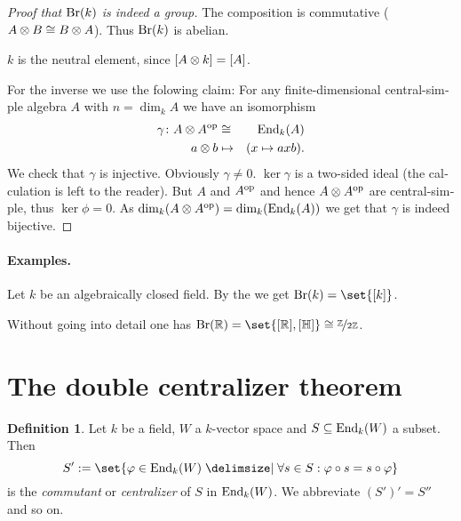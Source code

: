 \documentclass[12pt,a4paper]{scrartcl}
\theoremstyle{cplain}
\theoremstyle{cplain}
\theoremstyle{cplain}
\theoremstyle{definition}
\newtheorem*{deff}{Definition}
\begin{document}
\begin{otherlanguage}{english}
\begin{proof}[Proof that $\operatorname{Br}(k)$ is indeed a group]
  The composition is commutative ($A \otimes B \cong B\otimes A$). Thus $\operatorname{Br}(k)$ is abelian.
  
  $k$ is the neutral element, since $[A\otimes k] = [A]$.
  
  For the inverse we use the folowing claim: For any finite-dimensional central-simple algebra $A$ with $n = \dim_kA$ we have an isomorphism
  \begin{eqnarray*}
    \gamma\colon A \otimes A^{\operatorname{op}} &\cong& \operatorname{End}_k(A) \\
    a \otimes b &\mapsto& (x \mapsto axb).
  \end{eqnarray*}
  We check that $\gamma$ is injective. Obviously $\gamma \neq 0$. $\ker\gamma$ is a two-sided ideal (the calculation is left to the reader). But $A$ and $A^{\operatorname{op}}$ and hence $A \otimes A^{\operatorname{op}}$ are central-simple, thus $\ker\phi = 0$. As $\dim_k (A\otimes A^{\operatorname{op}}) = \dim_k(\operatorname{End}_k(A))$ we get that $\gamma$ is indeed bijective. %
\end{proof}

\paragraph{Examples.}
Let $k$ be an algebraically closed field. By the  we get $\Br(k) = \set{[k]}$.

Without going into detail one has $\Br(\IR) = \set{[\IR],[\IH]} \cong \fak\IZ{2\IZ}$.


\section{The double centralizer theorem}
\begin{deff}
  Let $k$ be a field, $W$ a $k$-vector space and $S \subseteq \operatorname{End}_k(W)$ a subset. Then \[ S' := \set{\phi\in\End_k(W) \given \forall s\in S: \phi\circ s = s\circ \phi}\] is the \emph{commutant} or \emph{centralizer} of $S$ in $\operatorname{End}_k(W)$. We abbreviate $(S')' = S''$ and so on.
\end{deff}


\end{otherlanguage}
\end{document}
